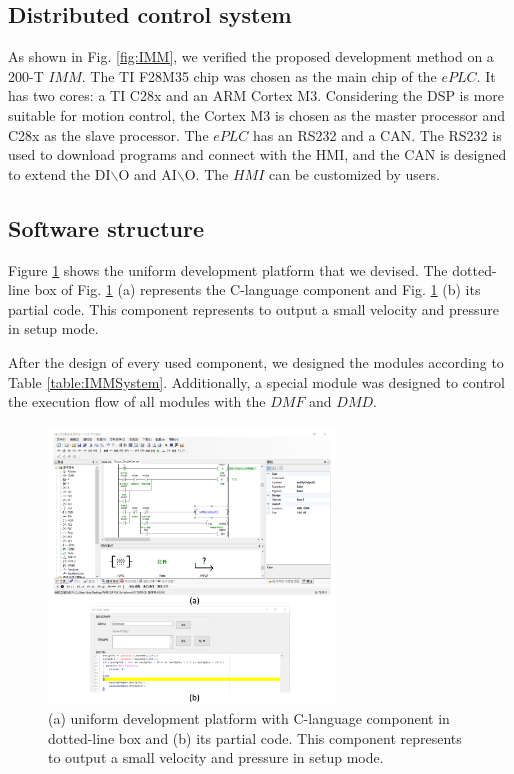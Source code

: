\documentclass[journal,UTF8]{IEEEtran}
\begin{document}
	\subsection{Distributed control system}
	As shown in Fig. \ref{fig:IMM}, we verified the proposed development method on a 200-T $IMM$. The TI F28M35 chip was chosen as the main chip of the $ePLC$. It has two cores: a TI C28x and an ARM Cortex M3. Considering the DSP is more suitable for motion control, the Cortex M3 is chosen as the master processor and C28x as the slave processor. The $ePLC$ has an RS232 and a CAN. The RS232 is used to download programs and connect with the HMI, and the CAN is designed to extend the DI$\backslash$O and AI$\backslash$O. The $HMI$ can be customized by users.
	
	\subsection{Software structure}
	Figure \ref{fig:ld} shows the uniform development platform that we devised. The dotted-line box of Fig. \ref{fig:ld} (a) represents the C-language component and Fig. \ref{fig:ld} (b) its partial code. This component represents to output a small velocity and pressure in setup mode.
	
	After the design of every used component, we designed the modules according to Table \ref{table:IMMSystem}. Additionally, a special module was designed to control the execution flow of all modules with the $DMF$ and $DMD$.
	
	\begin{figure}
		\centering
		\includegraphics[width=3in]{fig/ld.pdf}
		\caption{(a) uniform development platform with C-language component in dotted-line box and (b) its partial code. This component represents to output a small velocity and pressure in setup mode.}
		\label{fig:ld}
	\end{figure}
	
\end{document}
